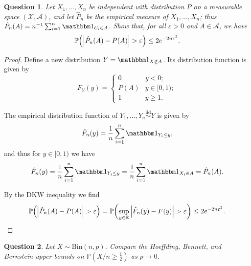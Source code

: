 \documentclass{article}
\theoremstyle{plain}
\newtheorem{question}{Question}
\theoremstyle{remark}
\renewcommand{\epsilon}{\varepsilon}
\newcommand{\Bb}{\mathbb}
\newcommand{\Cal}{\mathcal}
\newcommand{\Rm}{\mathrm}
\newcommand{\PP}{\Bb P}
\newcommand{\RR}{\Bb R}
\newcommand\eps\epsilon
\newcommand\ind{\mathbbm 1} %
\newcommand\iid{\overset{\Rm{iid}}{\sim}}
\begin{document}
\begin{question}
    Let $X_1, \dotsc, X_n$ be independent with distribution $P$ on a measurable space $(\Cal X, \Cal A)$, and let $\hat P_n$ be the empirical measure of $X_1, \dotsc, X_n$; thus $\hat P_n(A) = n^{-1} \sum_{i=1}^n \ind_{U_{i} \in A}$. Show that, for all $\eps > 0$ and $A \in \Cal A$, we have
    \[
    \PP\qty(\abs{\hat P_n(A) - P(A)} > \eps) \leq 2 e^{-2n\eps^2}. 
    \]
\end{question}

\begin{proof}
    Define a new distribution $Y = \ind_{X \notin A}$. Its distribution function is given by
    \[
    F_Y(y) = \begin{cases}
        0 &\text{$y < 0$}; \\
        P(A) &\text{$y \in [0, 1)$}; \\
        1 &y \geq 1. 
    \end{cases}
    \]
    
    The empirical distribution function of $Y_1, \dotsc, Y_n \iid Y$ is given by
    \[
    \hat F_n(y) = \frac1n \sum_{i=1}^n \ind_{Y_i \leq y},
    \]
    and thus for $y \in [0, 1)$ we have
    \[
    \hat F_n(y) = \frac1n \sum_{i=1}^n \ind_{Y_i \leq y} = \frac1n \sum_{i=1}^n \ind_{X_i \in A} = \hat P_n(A).
    \]
    
    By the DKW inequality we find
    \begin{align*}
    	\PP\qty(\abs{\hat P_n(A) - P(A)} > \eps) = \PP \qty(\sup_{y \in \RR} \abs{\hat F_n(y) - F(y)} > \eps) \leq 2e^{-2n\eps^2}.
    \end{align*}
\end{proof}

\begin{question}
	Let $X \sim \Rm{Bin}(n, p)$. Compare the Hoeffding, Bennett, and Bernstein upper bounds on $\PP(X/n \geq \frac12)$ as $p \to 0$. 
\end{question}
\end{document}
